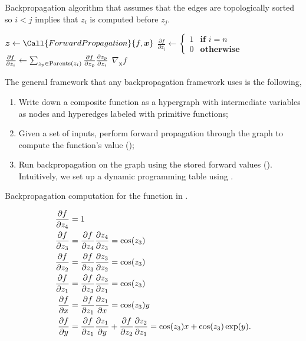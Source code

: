 \begin{algorithm}
  \caption{Backpropagation algorithm that assumes that the edges are
  topologically sorted so $i<j$ implies that $z_i$ is computed before $z_j$.}
  \label{alg:backpropagation}

  \begin{algorithmic}[1]
      \State $\bm{z} \gets \Call{ForwardPropagation}{f,\bm{x}}$
      \State $\frac{\partial f}{\partial z_i} \gets \begin{cases}
        1 & \textbf{if } i=n \\
        0 & \textbf{otherwise}
      \end{cases}$ 
       
        \State $\pdv{f}{z_i} \gets \sum_{z_p\in\mathrm{Parents}(z_i)} \pdv{f}{z_p} \pdv{z_p}{z_i}$ 
      \EndFor
      \State \Return $\nabla_{\bm{x}} f$
    \EndFunction
  \end{algorithmic}
\end{algorithm}

The general framework that any backpropagation framework uses is the following,
\begin{enumerate}
  \item Write down a composite function as a hypergraph with intermediate
    variables as nodes and hyperedges labeled with primitive functions;
  \item Given a set of inputs, perform forward propagation through the graph to
    compute the function's value ();
  \item Run backpropagation on the graph using the stored forward values
    (). Intuitively, we set up a dynamic programming
    table using .
\end{enumerate}

\begin{example}
  \caption{Backpropagation computation for the function in .}
  \begin{align*}
    \pdv{f}{z_4} &= 1 \\
    \pdv{f}{z_3} &= \pdv{f}{z_4} \pdv{z_4}{z_3} = \cos(z_3) \\
    \pdv{f}{z_2} &= \pdv{f}{z_3} \pdv{z_3}{z_2} = \cos(z_3) \\
    \pdv{f}{z_1} &= \pdv{f}{z_3} \pdv{z_3}{z_1} = \cos(z_3) \\
    \pdv{f}{x} &= \pdv{f}{z_1} \pdv{z_1}{x} = \cos(z_3) y \\
    \pdv{f}{y} &= \pdv{f}{z_1} \pdv{z_1}{y} + \pdv{f}{z_2} \pdv{z_2}{z_1} = \cos(z_3) x + \cos(z_3) \exp(y)
  .\end{align*}
\end{example}
